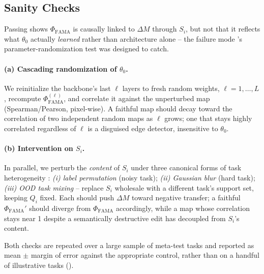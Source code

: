 \subsection{Sanity Checks}
\label{sec:sanity}

Passing \biadt shows $\Phi_{\mathrm{FAMA}}$ is causally linked to $\Delta M$ through $S_i$, but not that it reflects what $\theta_0$ actually \emph{learned} rather than architecture alone -- the failure mode \citet{adebayo2018sanity}'s parameter-randomization test was designed to catch.

\paragraph{(a) Cascading randomization of $\theta_0$.} We reinitialize the backbone's last $\ell$ layers to fresh random weights, $\ell=1,\dots,L$, recompute $\Phi_{\mathrm{FAMA}}^{(\ell)}$, and correlate it against the unperturbed map (Spearman/Pearson, pixel-wise). A faithful map should decay toward the correlation of two independent random maps as $\ell$ grows; one that stays highly correlated regardless of $\ell$ is a disguised edge detector, insensitive to $\theta_0$.

\paragraph{(b) Intervention on $S_i$.} In parallel, we perturb the \emph{content} of $S_i$ under three canonical forms of task heterogeneity \citep{si2025meta}: \emph{(i) label permutation} (noisy task); \emph{(ii) Gaussian blur} (hard task); \emph{(iii) OOD task mixing} -- replace $S_i$ wholesale with a different task's support set, keeping $Q_i$ fixed. Each should push $\Delta M$ toward negative transfer; a faithful $\Phi_{\mathrm{FAMA}}'$ should diverge from $\Phi_{\mathrm{FAMA}}$ accordingly, while a map whose correlation stays near 1 despite a semantically destructive edit has decoupled from $S_i$'s content.

Both checks are repeated over a large sample of meta-test tasks and reported as mean $\pm$ margin of error against the appropriate control, rather than on a handful of illustrative tasks ().
